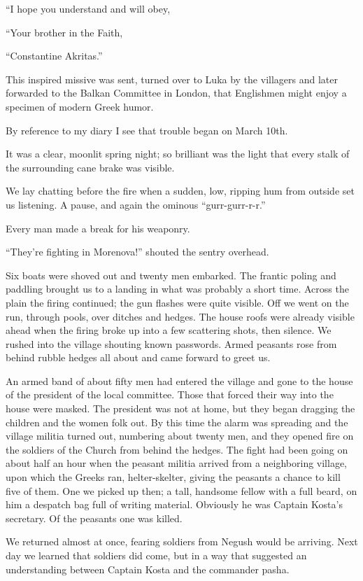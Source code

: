 \documentclass[a5paper,12pt]{book}
\begin{document}
“I hope you understand and will obey, 

“Your brother in the Faith, 

“Constantine Akritas.” 

This inspired missive was sent, turned over to Luka by the villagers and later forwarded to the Balkan Committee in London, that Englishmen might enjoy a specimen of modern Greek humor. 

By reference to my diary I see that trouble began on March 10th. 

It was a clear, moonlit spring night; so brilliant was the light that every stalk of the surrounding cane brake was visible. 

We lay chatting before the fire when a sudden, low, ripping hum from outside set us listening. A pause, and again the ominous “gurr-gurr-r-r.” 

Every man made a break for his weaponry. 

“They’re fighting in Morenova!” shouted the sentry overhead. 

Six boats were shoved out and twenty men embarked. The frantic poling and paddling brought us to a landing in what was probably a short time. Across the plain the firing continued; the gun flashes were quite visible. Off we went on the run, through pools, over ditches and hedges. The house roofs were already visible ahead when the firing broke up into a few scattering shots, then silence. We rushed into the village shouting known passwords. Armed peasants rose from behind rubble hedges all about and came forward to greet us. 

An armed band of about fifty men had entered the village and gone to the house of the president of the local committee. Those that forced their way into the house were masked. The president was not at home, but they began dragging the children and the women folk out. By this time the alarm was spreading and the village militia turned out, numbering about twenty men, and they opened fire on the soldiers of the Church from behind the hedges. The fight had been going on about half an hour when the peasant militia arrived from a neighboring village, upon which the Greeks ran, helter-skelter, giving the peasants a chance to kill five of them. One we picked up then; a tall, handsome fellow with a full beard, on him a despatch bag full of writing material. Obviously he was Captain Kosta’s secretary. Of the peasants one was killed. 

We returned almost at once, fearing soldiers from Negush would be arriving. Next day we learned that soldiers did come, but in a way that suggested an understanding between Captain Kosta and the commander pasha. 
\end{document}
